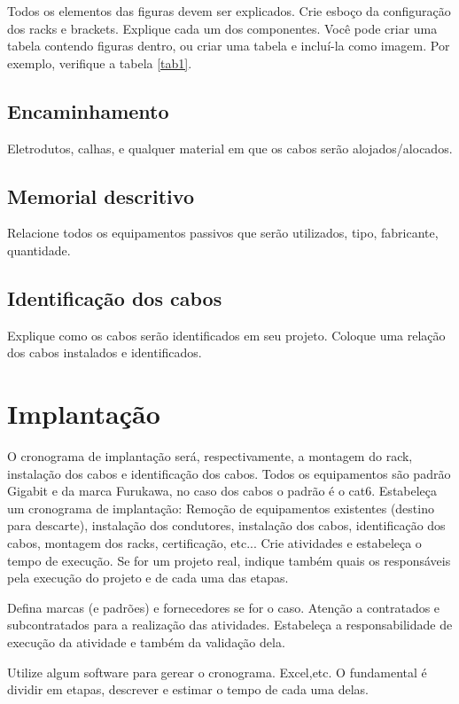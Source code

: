 \documentclass[	DIV=calc,%
							paper=a4,%
							fontsize=12pt,%
							onecolumn]{scrartcl}	 					%
\begin{document}
Todos os elementos das figuras devem ser explicados. 
Crie esboço da configuração dos racks e brackets. Explique cada um dos componentes. Você pode criar uma tabela contendo figuras dentro, ou criar uma tabela e incluí-la como imagem. Por exemplo, verifique a tabela \ref{tab1}.



\subsection{Encaminhamento}
Eletrodutos, calhas, e qualquer material em que os cabos serão alojados/alocados.

\subsection{Memorial descritivo}

Relacione todos os equipamentos passivos que serão utilizados, tipo, fabricante, quantidade.

\subsection{Identificação dos cabos}
Explique como os cabos serão identificados em seu projeto. Coloque uma relação dos cabos instalados e identificados.

\section{Implantação}
O cronograma de implantação será, respectivamente, a montagem do rack, instalação dos cabos e identificação dos cabos.
Todos os equipamentos são padrão Gigabit e da marca Furukawa, no caso dos cabos o padrão é o cat6.
Estabeleça um cronograma de implantação:
Remoção de equipamentos existentes (destino para descarte), instalação dos condutores, instalação dos cabos, 
identificação dos cabos, montagem dos racks, certificação, etc... Crie atividades e estabeleça o tempo de execução. Se for um projeto real, indique também quais os responsáveis pela execução do projeto e de cada uma das etapas.

Defina marcas (e padrões) e fornecedores se for o caso. Atenção a contratados e subcontratados para a realização das atividades. Estabeleça a responsabilidade de execução da atividade e também da validação dela.

Utilize algum software para gerear o cronograma. Excel,etc. O fundamental é dividir em etapas, descrever e estimar o tempo de cada uma delas.
\end{document}

